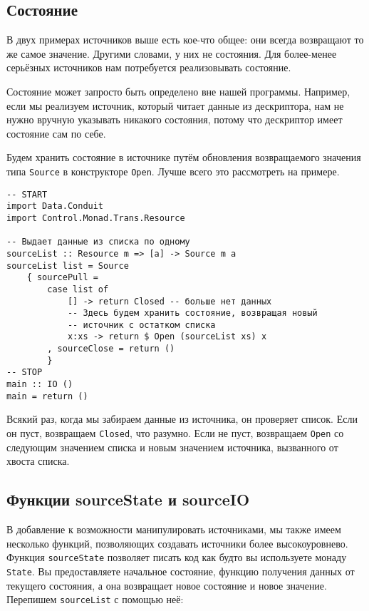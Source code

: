 \subsection{Состояние}
В двух примерах источников выше есть кое-что общее: они всегда возвращают то же самое
значение. Другими словами, у них не состояния. Для более-менее серьёзных источников нам
потребуется реализовывать состояние.

\begin{remark}
Состояние может запросто быть определено вне нашей программы. Например, если мы
реализуем источник, который читает данные из дескриптора, нам не нужно вручную
указывать никакого состояния, потому что дескриптор имеет состояние сам по себе.
\end{remark}

Будем хранить состояние в источнике путём обновления возвращаемого значения типа
\lstinline=Source= в конструкторе \lstinline=Open=. Лучше всего это рассмотреть на
примере.

\begin{lstlisting}
-- START
import Data.Conduit
import Control.Monad.Trans.Resource

-- Выдает данные из списка по одному
sourceList :: Resource m => [a] -> Source m a
sourceList list = Source
    { sourcePull =
        case list of
            [] -> return Closed -- больше нет данных
            -- Здесь будем хранить состояние, возвращая новый 
            -- источник с остатком списка
            x:xs -> return $ Open (sourceList xs) x
        , sourceClose = return ()
        }
-- STOP
main :: IO ()
main = return ()
\end{lstlisting}

Всякий раз, когда мы забираем данные из источника, он проверяет список. Если он пуст,
возвращаем \lstinline=Closed=, что разумно. Если не пуст, возвращаем \lstinline=Open= со
следующим значением
списка и новым значением источника, вызванного от хвоста списка.

\subsection{Функции sourceState и sourceIO}
В добавление к возможности манипулировать источниками, мы также имеем несколько функций,
позволяющих создавать источники более высокоуровнево. Функция \lstinline=sourceState=
позволяет писать
код как будто вы используете монаду \lstinline=State=. Вы предоставляете начальное
состояние,
функцию получения данных от текущего состояния, а она возвращает новое состояние и
новое значение. Перепишем \lstinline=sourceList= с помощью неё:

